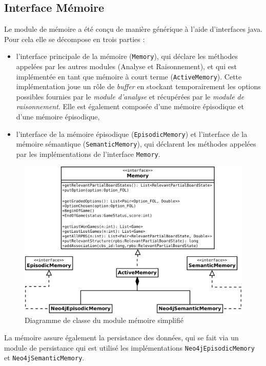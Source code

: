 \subsection{Interface Mémoire}

Le module de mémoire a été conçu de manière générique à l'aide d'interfaces java. Pour cela elle se décompose en trois parties :

\begin{itemize}
\item l'interface principale de la mémoire (\texttt{Memory}), qui déclare les méthodes appelées par les autres modules (Analyse et Raisonnement), et qui est implémentée en tant que mémoire à court terme (\texttt{ActiveMemory}). Cette implémentation joue un rôle de \emph{buffer} en stockant temporairement les options possibles fournies par le \emph{module d'analyse} et récupérées par le \emph{module de raisonnement}. Elle est également composée d'une mémoire épisodique et d'une mémoire épisodique,

\item l'interface de la mémoire épisodique (\texttt{EpisodicMemory}) et l'interface de la mémoire sémantique (\texttt{SemanticMemory}), qui déclarent les méthodes appelées par les implémentations de l'interface \texttt{Memory}.
\end{itemize}

\begin{figure}[H]
\includegraphics[width=\textwidth]{files/memoire/interface}
\caption{Diagramme de classe du module mémoire simplifié}
\end{figure}

La mémoire assure également la persistance des données, qui se fait via un module de persistance qui est utilisé les implémentations \texttt{Neo4jEpisodicMemory} et \texttt{Neo4jSemanticMemory}. 

